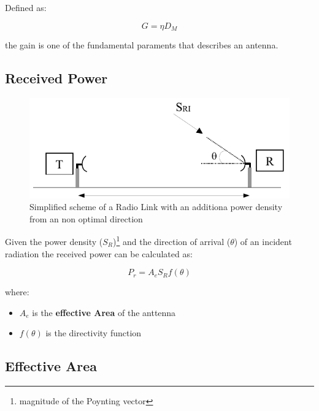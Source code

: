 Defined as:

\begin{equation}
	G = \eta D_M
\end{equation}

the gain is one of the fundamental paraments that describes an antenna.


\subsection{Received Power} %
\label{sub:received_power}


\begin{figure}[h]
	\centering
	\includegraphics[scale=0.3]{Immagini/SR}
	
	\caption{Simplified scheme of a Radio Link with an additiona power density from an non optimal direction}
	\label{fig:link}
\end{figure}

Given the power density ($S_R$)\footnote{magnitude of the Poynting vector} and the direction of arrival ($ \theta $) of an incident radiation the received power can be calculated as:

\begin{equation}
	P_r=A_{\textit{e}} S_R f(\theta)
\end{equation}

where:

\begin{itemize}
	\item $A_{\textit{e}}$ is the \textbf{effective Area} of the anttenna
	\item $f(\theta)$ is the directivity function

\end{itemize}




\subsection{Effective Area} %
\label{sub:effective_area}



